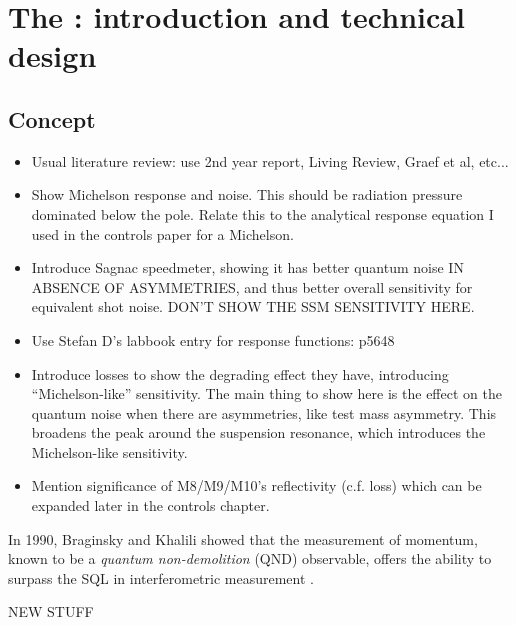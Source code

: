 \chapter{\label{c:speedmeter-intro}The \SSMEXPT{}: introduction and technical design}

\section{Concept}
\begin{itemize}
  \item Usual literature review: use 2nd year report, Living Review, Graef et al, etc...
  \item Show Michelson response and noise. This should be radiation pressure dominated below the pole. Relate this to the analytical response equation I used in the controls paper for a Michelson.
  \item Introduce Sagnac speedmeter, showing it has better quantum noise IN ABSENCE OF ASYMMETRIES, and thus better overall sensitivity for equivalent shot noise. DON'T SHOW THE SSM SENSITIVITY HERE.
  \item Use Stefan D's labbook entry for response functions: p5648
  \item Introduce losses to show the degrading effect they have, introducing ``Michelson-like'' sensitivity. The main thing to show here is the effect on the quantum noise when there are asymmetries, like test mass asymmetry. This broadens the peak around the suspension resonance, which introduces the Michelson-like sensitivity.
  \item Mention significance of M8/M9/M10's reflectivity (c.f. loss) which can be expanded later in the controls chapter.
\end{itemize}

In 1990, Braginsky and Khalili showed that the measurement of momentum, known to be a \emph{quantum non-demolition} (\gls{QND}) observable, offers the ability to surpass the \gls{SQL} in interferometric measurement \cite{Braginsky1990}.





NEW STUFF

